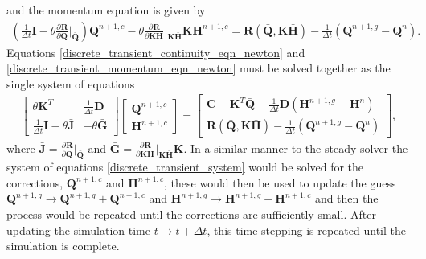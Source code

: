 \documentclass[12pt]{article}
\newcommand{\pardiv}[3]{\frac{\partial^{#1} #2}{\partial #3^{#1}}}
\begin{document}
{ \color{green} and the momentum equation is given by
\begin{align}\label{discrete_transient_momentum_eqn_newton}
\left(\frac{1}{\Delta t} \mathbf{I} - \theta \pardiv{}{\mathbf{R}}{\mathbf{Q}} \Bigg\vert_{\bar{\mathbf{Q}}} \right) \mathbf{Q}^{n+1,c} - \theta \pardiv{}{\mathbf{R}}{\mathbf{K} \mathbf{H}} \Bigg\vert_{\mathbf{K} \bar{\mathbf{H}}} \mathbf{K} \mathbf{H}^{n+1,c} = \mathbf{R}\left(\bar{\mathbf{Q}}, \mathbf{K} \bar{\mathbf{H}} \right) - \frac{1}{\Delta t} \left(\mathbf{Q}^{n+1,g} - \mathbf{Q}^{n} \right).
\end{align} 
Equations \eqref{discrete_transient_continuity_eqn_newton} and \eqref{discrete_transient_momentum_eqn_newton} must be solved together as the single system of equations
\begin{align}\label{discrete_transient_system}
\begin{bmatrix}
\theta \mathbf{K}^T & \frac{1}{\Delta t}\mathbf{D} \\
\frac{1}{\Delta t}\mathbf{I}-\theta \bar{\mathbf{J}} & - \theta \bar{\mathbf{G}}
\end{bmatrix} 
\begin{bmatrix}
\mathbf{Q}^{n+1,c} \\ \mathbf{H}^{n+1,c}
\end{bmatrix} = \begin{bmatrix}
\mathbf{C} - \mathbf{K}^T \bar{\mathbf{Q}} - \frac{1}{\Delta t} \mathbf{D} \left( \mathbf{H}^{n+1,g} - \mathbf{H}^{n} \right) \\
\mathbf{R}\left(\bar{\mathbf{Q}}, \mathbf{K} \bar{\mathbf{H}} \right) - \frac{1}{\Delta t} \left(\mathbf{Q}^{n+1,g} - \mathbf{Q}^{n} \right)
\end{bmatrix},
\end{align}
where $\bar{\mathbf{J}} = \pardiv{}{\mathbf{R}}{\mathbf{Q}} \big\vert_{\bar{\mathbf{Q}}}$ and $\bar{\mathbf{G}} = \pardiv{}{\mathbf{R}}{\mathbf{K} \mathbf{H}} \big\vert_{\mathbf{K} \bar{\mathbf{H}}} \mathbf{K} $. }In a similar manner to the steady solver the system of equations \eqref{discrete_transient_system} would be solved for the corrections, $\mathbf{Q}^{n+1,c}$ and $\mathbf{H}^{n+1,c}$, these would then be used to update the guess $\mathbf{Q}^{n+1,g} \rightarrow \mathbf{Q}^{n+1,g} + \mathbf{Q}^{n+1,c} $ and $\mathbf{H}^{n+1,g} \rightarrow \mathbf{H}^{n+1,g} + \mathbf{H}^{n+1,c} $ and then the process would be repeated until the corrections are sufficiently small. After updating the simulation time $t \rightarrow t + \Delta t$, this time-stepping is repeated until the simulation is complete.   
\end{document}
